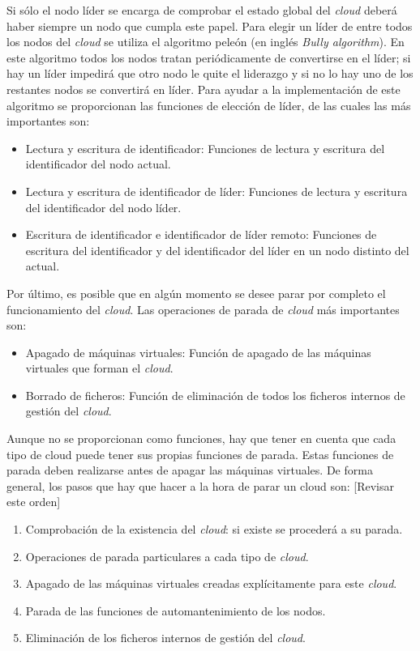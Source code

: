 Si sólo el nodo líder se encarga de comprobar el estado global del \emph{cloud} deberá haber siempre un nodo que cumpla este papel. Para elegir un líder de entre todos los nodos del \emph{cloud} se utiliza el algoritmo peleón (en inglés \emph{Bully algorithm}). En este algoritmo todos los nodos tratan periódicamente de convertirse en el líder; si hay un líder impedirá que otro nodo le quite el liderazgo y si no lo hay uno de los restantes nodos se convertirá en líder. Para ayudar a la implementación de este algoritmo se proporcionan las funciones de elección de líder, de las cuales las más importantes son:
\begin{itemize}
\item Lectura y escritura de identificador: Funciones de lectura y escritura del identificador del nodo actual.
\item Lectura y escritura de identificador de líder: Funciones de lectura y escritura del identificador del nodo líder.
\item Escritura de identificador e identificador de líder remoto: Funciones de escritura del identificador y del identificador del líder en un nodo distinto del actual.
\end{itemize}

Por último, es posible que en algún momento se desee parar por completo el funcionamiento del \emph{cloud}. Las operaciones de parada de \emph{cloud} más importantes son:
\begin{itemize}
\item Apagado de máquinas virtuales: Función de apagado de las máquinas virtuales que forman el \emph{cloud}.
\item Borrado de ficheros: Función de eliminación de todos los ficheros internos de gestión del \emph{cloud}.
\end{itemize}

Aunque no se proporcionan como funciones, hay que tener en cuenta que cada tipo de cloud puede tener sus propias funciones de parada. Estas funciones de parada deben realizarse antes de apagar las máquinas virtuales. De forma general, los pasos que hay que hacer a la hora de parar un cloud son:
[Revisar este orden]
\begin{enumerate}
\item Comprobación de la existencia del \emph{cloud}: si existe se procederá a su parada.
\item Operaciones de parada particulares a cada tipo de \emph{cloud}.
\item Apagado de las máquinas virtuales creadas explícitamente para este \emph{cloud}.
\item Parada de las funciones de automantenimiento de los nodos.
\item Eliminación de los ficheros internos de gestión del \emph{cloud}.
\end{enumerate}


